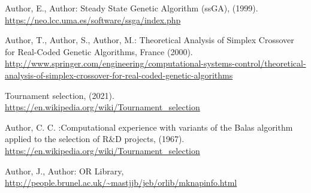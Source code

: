 \documentclass[runningheads]{llncs}
\begin{document}
%
%


%
\begin{thebibliography}{8}
	Author, E., Author: Steady State Genetic Algorithm (ssGA),
	(1999). \url{https://neo.lcc.uma.es/software/ssga/index.php}

	Author, T., Author, S., Author, M.: Theoretical Analysis of Simplex Crossover for Real-Coded Genetic Algorithms,
	France (2000). \url{http://www.springer.com/engineering/computational-systems-control/theoretical-analysis-of-simplex-crossover-for-real-coded-genetic-algorithms}

	Tournament selection,
	(2021). \url{https://en.wikipedia.org/wiki/Tournament_selection}

	Author, C. C. :Computational experience with variants of the Balas algorithm applied to the selection of R\&D projects,
	(1967). \url{https://en.wikipedia.org/wiki/Tournament_selection}

	Author, J., Author: OR Library,
	\url{http://people.brunel.ac.uk/~mastjjb/jeb/orlib/mknapinfo.html}


\end{thebibliography}
\end{document}
